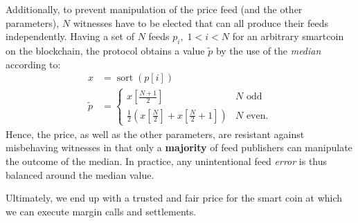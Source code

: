 Additionally, to prevent manipulation of the price feed (and the other
parameters), $N$ witnesses have to be elected that can all produce their feeds
independently. Having a set of $N$ feeds $p_i,\;1<i<N$ for an arbitrary
smartcoin on the blockchain, the protocol obtains a value $\tilde{p}$ by the
use of the \emph{median} according to:
\begin{align}
 x &= \operatorname{sort}(p[i])\\
 \tilde p &=\begin{cases}
   x[\frac{N+1}{2}]                                               & N \text{ odd}\\
   \frac {1}{2}\left(x[{\frac{N}{2}}] + x[\frac{N}{2} + 1]\right) & N \text{ even.}
 \end{cases}
\end{align}
Hence, the price, as well as the other parameters, are resistant against
misbehaving witnesses in that only a \textbf{majority} of feed publishers can
manipulate the outcome of the median. In practice, any unintentional feed
\emph{error} is thus balanced around the median value.

Ultimately, we end up with a trusted and fair price for the smart coin at which
we can execute margin calls and settlements.
